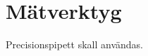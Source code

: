 \documentclass[./chem_exercises.tex]{subfiles}
\begin{document}
\section{Mätverktyg}
Precisionspipett skall användas.












\end{document}
